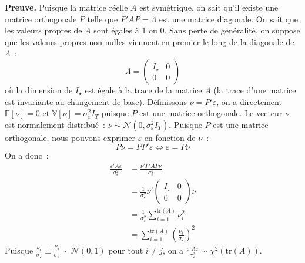 \documentclass[10pt]{beamer}
\begin{document}
\begin{notes}
\begin{itemize}
       \textbf{Preuve.} Puisque la matrice réelle $A$ est symétrique,
       on sait qu'il existe une matrice orthogonale $P$ telle
       que $P'AP = \Lambda$ est une matrice diagonale. On sait que les
       valeurs propres de $A$ sont égales à 1 ou 0. Sans perte de
       généralité, on suppose que les valeurs propres non nulles
       viennent en premier le long de la diagonale de $\Lambda$~:
       \[
         \Lambda =
         \begin{pmatrix}
           I_{\star} & 0 \\
           0 & 0
         \end{pmatrix}
       \]
       où la dimension de $I_{\star}$ est égale à la trace de la
       matrice $A$ (la trace d'une matrice est invariante au
       changement de base). Définissons $\nu = P'\varepsilon$, on a
       directement $\mathbb E[\nu] = 0$
       et $\mathbb V[\nu] = \sigma_{\varepsilon}^2I_T$ puisque $P$ est
       une matrice orthogonale. Le vecteur $\nu$ est normalement
       distribué~:
       $\nu \sim \mathcal N \left( 0, \sigma_{\varepsilon}^2I_T \right)$. Puisque
       $P$ est une matrice orthogonale, nous pouvons
       exprimer $\varepsilon$ en fonction de $\nu$~:
       \[
         P\nu = PP'\varepsilon \Leftrightarrow \varepsilon = P\nu
       \]
       On a donc~:
       \[
         \begin{split}
           \frac{\varepsilon' A \varepsilon}{\sigma_{\varepsilon}^2} &= \frac{\nu'P'A P \nu}{\sigma_{\varepsilon}^2}\\
                                                                     &= \frac{1}{\sigma_{\varepsilon}^2}\nu'
                                                                       \begin{pmatrix}
                                                                         I_{\star} & 0\\
                                                                         0 & 0
                                                                       \end{pmatrix} \nu \\
                                                                     &= \frac{1}{\sigma_{\varepsilon}^2}\sum_{i=1}^{\mathrm{tr}(A)}\nu_i^2\\
                                                                     &= \sum_{i=1}^{\mathrm{tr}(A)}\left( \frac{\nu_i}{\sigma_{\varepsilon}} \right)^2
         \end{split}
       \]
       Puisque $\frac{\nu_i}{\sigma_\varepsilon} \perp \frac{\nu_j}{\sigma_\varepsilon} \sim \mathcal N(0,1)$ pour tout $i\neq j$, on a $\frac{\varepsilon' A \varepsilon}{\sigma_{\varepsilon}^2}\sim\chi^2\left( \mathrm{tr}(A) \right)$.\newline


\end{itemize}
\end{notes}
\end{document}
